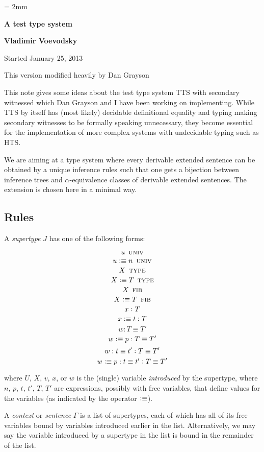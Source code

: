 \documentclass[11pt]{article}
\newcommand{\eqd}{\equiv}
\newcommand{\ccolon}{\vcentcolon}
\newcommand{\UNIV}{\mathop{\text{ \sc univ}}}
\newcommand{\TYPE}{\mathop{\text{ \sc type}}}
\newcommand{\FTYPE}{\mathop{\text{ \sc fib}}}
\newcommand{\defn}{\vcentcolon\equiv}
\begin{document}
\parskip = 2mm
\begin{center}
{\bf\Large A test type system}

{\bf Vladimir Voevodsky}

{Started January 25, 2013}  

{This version modified heavily by Dan Grayson}  
\end{center}

\tableofcontents

This note gives some ideas about the test type system TTS with secondary
witnessed which Dan Grayson and I have been working on implementing. While TTS
by itself has (most likely) decidable definitional equality and typing making
secondary witnesses to be formally speaking unnecessary, they become essential
for the implementation of more complex systems with undecidable typing such as
HTS.

We are aiming at a type system where every derivable extended sentence can be
obtained by a unique inference rules such that one gets a bijection between
inference trees and $\alpha$-equivalence classes of derivable extended
sentences.  The extension is chosen here in a minimal way.

\subsection{Rules}

A {\em supertype} $J$ has one of the following forms:

$$ u \UNIV $$
$$ u \defn n \UNIV $$
$$ X \TYPE $$
$$ X \defn T \TYPE $$
$$ X \FTYPE $$
$$ X \defn T \FTYPE $$
$$ x \ccolon T $$
$$ x \defn t \ccolon T $$
$$ w : T \eqd T' $$
$$ w \defn p : T \eqd T' $$
$$ w : t \eqd t' \ccolon T \eqd T' $$
$$ w \defn p : t \eqd t' \ccolon T \eqd T' $$

where $U$, $X$, $v$, $x$, or $w$ is the (single) variable {\em introduced} by
the supertype, where $n$, $p$, $t$, $t'$, $T$, $T'$ are expressions, possibly
with free variables, that define values for the variables (as indicated by the
operator $\defn$).

A {\em context} or {\em sentence} $\Gamma$ is a list of supertypes, each of
which has all of its free variables bound by variables introduced earlier in
the list.  Alternatively, we may say the variable introduced by a supertype in
the list is bound in the remainder of the list.
\end{document}
